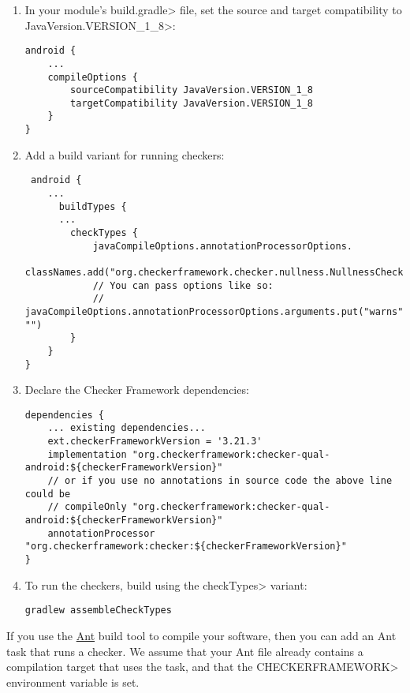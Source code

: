 \begin{enumerate}

\item In your module's \<build.gradle> file, set the source and target
  compatibility to \<JavaVersion.VERSION\_1\_8>:

\begin{Verbatim}
android {
    ...
    compileOptions {
        sourceCompatibility JavaVersion.VERSION_1_8
        targetCompatibility JavaVersion.VERSION_1_8
    }
}
\end{Verbatim}

\item Add a build variant for running checkers:

 \begin{Verbatim}
 android {
    ...
      buildTypes {
      ...
        checkTypes {
            javaCompileOptions.annotationProcessorOptions.
                    classNames.add("org.checkerframework.checker.nullness.NullnessChecker")
            // You can pass options like so:
            // javaCompileOptions.annotationProcessorOptions.arguments.put("warns", "")
        }
    }
}
\end{Verbatim}

\item Declare the Checker Framework dependencies:

\begin{mysmall}
\begin{Verbatim}
dependencies {
    ... existing dependencies...
    ext.checkerFrameworkVersion = '3.21.3'
    implementation "org.checkerframework:checker-qual-android:${checkerFrameworkVersion}"
    // or if you use no annotations in source code the above line could be
    // compileOnly "org.checkerframework:checker-qual-android:${checkerFrameworkVersion}"
    annotationProcessor "org.checkerframework:checker:${checkerFrameworkVersion}"
}
\end{Verbatim}
\end{mysmall}

\item To run the checkers, build using the \<checkTypes> variant:
\begin{Verbatim}
gradlew assembleCheckTypes
\end{Verbatim}

\end{enumerate}



If you use the \href{http://ant.apache.org/}{Ant} build tool to compile
your software, then you can add an Ant task that runs a checker.  We assume
that your Ant file already contains a compilation target that uses the
 task, and that the \<CHECKERFRAMEWORK> environment variable is set.

